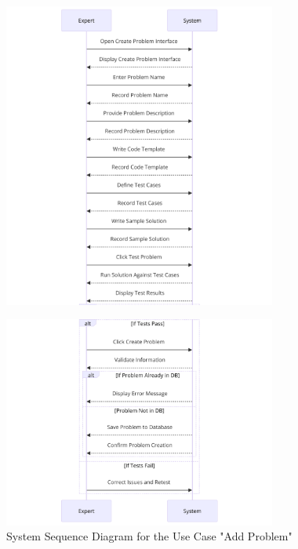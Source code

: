 \begin{figure}[h!]
    \centering*
    \includegraphics[width=0.8\textwidth]{images/diagram seqq.png}
\end{figure}
\begin{figure}[h!]
    \centering*
    \includegraphics[width=0.8\textwidth]{images/diagram6.png}
    \caption{System Sequence Diagram for the Use Case "Add Problem"}
    \label{System Sequence Diagram for the Use Case "Add Problem"}
\end{figure}

\newpage 
